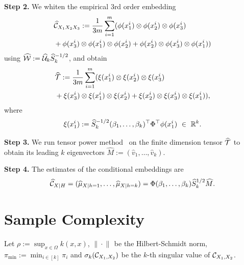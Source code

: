 \documentclass{article}
\begin{document}
{\bf Step 2.} We whiten the empirical 3rd order embedding
\begin{align*}
  &\widehat {\mathcal{C}}_{X_1 X_2 X_3}:= \frac{1}{3m}\sum_{i=1}^{m} (\phi(x_1^i) \otimes \phi(x_2^i) \otimes \phi(x_3^i) \\
  &+ \phi(x_3^i) \otimes \phi(x_1^i) \otimes \phi(x_2^i) + \phi(x_2^i) \otimes \phi(x_3^i) \otimes \phi(x_1^i))
\end{align*}
using $\widehat {\mathcal{W}}:= \widehat {\mathcal{U}}_k \widehat S_k^{-1/2}$, and obtain
\begin{align*}
  &\widehat {{\mathcal{T}}} := \frac{1}{3m}\sum_{i=1}^m (\xi(x_1^i) \otimes \xi(x_2^i) \otimes \xi(x_3^i) \\
  &+ \xi(x_3^i) \otimes \xi(x_1^i) \otimes \xi(x_2^i) + \xi(x_2^i) \otimes \xi(x_3^i) \otimes \xi(x_1^i)),
\end{align*}
where
$$
	\xi(x_1^i) := \widehat S_k^{-1/2} (\beta_1,\ldots,\beta_k)^\top \Phi^\top \phi(x_1^i)~ \in~\mathbb{R}^k.
$$

{\bf Step 3.} We run tensor power method~\cite{AnandkumarEtal:community12} on the finite dimension tensor $\widehat {{\mathcal{T}}}$ to obtain its leading $k$ eigenvectors $\widehat M:=(\widehat v_1,\ldots,\widehat v_k)$.

{\bf Step 4.} The estimates of the conditional embeddings are
\begin{align*}
  \widehat {\mathcal{C}}_{X|H} = (\widehat \mu_{X|h=1},\ldots, \widehat \mu_{X|h=k}) = \Phi (\beta_1,\ldots,\beta_k) \widehat  S_k^{1/2} \widehat M.
\end{align*}

\section{Sample Complexity}

Let $\rho:=\sup_{x \in \Omega} k(x,x)$,   $\| \cdot\|_{}$ be the Hilbert-Schmidt norm, $\pi_{\min}:=\min_{i\in [k]} \pi_i$ and $\sigma_k(\mathcal{C}_{X_1, X_2})$ be the $k$-th singular value of $\mathcal{C}_{X_1, X_2}$. 

 
\end{document}
